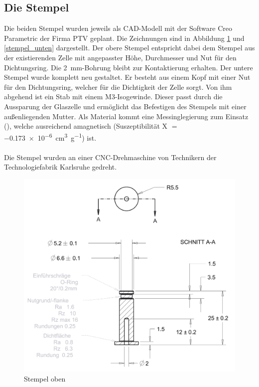 \documentclass[a4paper, 11pt, headsepline,footsepline,twoside,abstract]{scrbook}
\begin{document}
\subsection{Die Stempel}
Die beiden Stempel wurden jeweils als CAD-Modell mit der Software Creo Parametric der Firma PTV geplant. Die Zeichnungen sind in Abbildung \ref{stempel_oben} und \ref{stempel_unten} dargestellt. Der obere Stempel entspricht dabei dem Stempel aus der existierenden Zelle mit angepasster Höhe, Durchmesser und Nut für den Dichtungsring. Die \SI{2}{\milli\metre}-Bohrung bleibt zur Kontaktierung erhalten. Der untere Stempel wurde komplett neu gestaltet. Er besteht aus einem Kopf mit einer Nut für den Dichtungsring, welcher für die Dichtigkeit der Zelle sorgt. Von ihm abgehend ist ein Stab mit einem M3-Isogewinde. Dieser passt durch die Aussparung der Glaszelle und ermöglicht das Befestigen des Stempels mit einer außenliegenden Mutter. Als Material kommt eine Messinglegierung zum Einsatz (), welche ausreichend amagnetisch (Suszeptibilität X $=\;$\SI{-0.173e-6}{\cubic\centi\metre\per\gram}) ist. 
\\\\
Die Stempel wurden an einer CNC-Drehmaschine von Technikern der Technologiefabrik Karlsruhe gedreht. %
\begin{figure}
	\centering
	\includegraphics[width=0.7\columnwidth]{images/stempel_oben.png}
	\caption{Stempel oben}
	\label{stempel_oben}
\end{figure}
\end{document}
